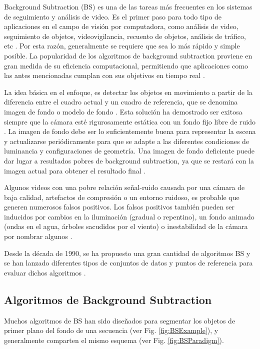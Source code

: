 Background Subtraction (BS) es una de las tareas más frecuentes en los sistemas de seguimiento y análisis de video. Es el primer paso para todo tipo de aplicaciones en el campo de visión por computadora, como análisis de video, seguimiento de objetos, videovigilancia, recuento de objetos, análisis de tráfico, etc \cite{GuangleTaoJiandanPingWenwu}. Por esta razón, generalmente se requiere que sea lo más rápido y simple posible. La popularidad de los algoritmos de background subtraction proviene en gran medida de su eficiencia computacional, permitiendo que aplicaciones como las antes mencionadas cumplan con sus objetivos en tiempo real \cite{DeepjoySarat}.

La idea básica en el enfoque, es detectar los objetos en movimiento a partir de la diferencia entre el cuadro actual y un cuadro de referencia, que se denomina imagen de fondo o modelo de fondo \cite{DeepjoySarat}. Esta solución ha demostrado ser exitosa siempre que la cámara esté rigurosamente estática con un fondo fijo libre de ruido \cite{YannickPierreMarcBrunoHeleneChristophe}. La imagen de fondo debe ser lo suficientemente buena para representar la escena y actualizarse periódicamente para que se adapte a las diferentes condiciones de luminancia y configuraciones de geometría. Una imagen de fondo deficiente puede dar lugar a resultados pobres de background subtraction, ya que se restará con la imagen actual para obtener el resultado final \cite{DeepjoySarat}.

Algunos videos con una pobre relación señal-ruido causada por una cámara de baja calidad, artefactos de compresión o un entorno ruidoso, es probable que generen numerosos falsos positivos. Los falsos positivos también pueden ser inducidos por cambios en la iluminación (gradual o repentino), un fondo animado (ondas en el agua, árboles sacudidos por el viento) o inestabilidad de la cámara por nombrar algunos \cite{YannickPierreMarcBrunoHeleneChristophe}.

Desde la década de 1990, se ha propuesto una gran cantidad de algoritmos BS y se han lanzado diferentes tipos de conjuntos de datos y puntos de referencia para evaluar dichos algoritmos \cite{GuangleTaoJiandanPingWenwu}.

\subsection{Algoritmos de Background Subtraction}

Muchos algoritmos de BS han sido diseñados para segmentar los objetos de primer plano del fondo de una secuencia (ver Fig. \ref{fig:BSExample}), y generalmente comparten el mismo esquema (ver Fig. \ref{fig:BSParadigm}).


